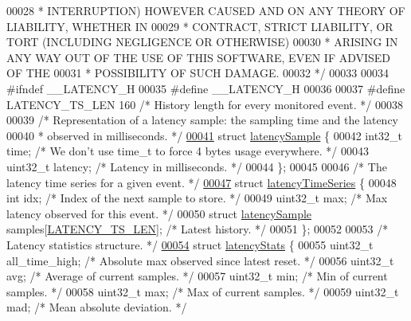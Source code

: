 \begin{DoxyCode}
00028 \textcolor{comment}{ * INTERRUPTION) HOWEVER CAUSED AND ON ANY THEORY OF LIABILITY, WHETHER IN}
00029 \textcolor{comment}{ * CONTRACT, STRICT LIABILITY, OR TORT (INCLUDING NEGLIGENCE OR OTHERWISE)}
00030 \textcolor{comment}{ * ARISING IN ANY WAY OUT OF THE USE OF THIS SOFTWARE, EVEN IF ADVISED OF THE}
00031 \textcolor{comment}{ * POSSIBILITY OF SUCH DAMAGE.}
00032 \textcolor{comment}{ */}
00033 
00034 \textcolor{preprocessor}{#}\textcolor{preprocessor}{ifndef} \textcolor{preprocessor}{\_\_LATENCY\_H}
00035 \textcolor{preprocessor}{#}\textcolor{preprocessor}{define} \textcolor{preprocessor}{\_\_LATENCY\_H}
00036 
00037 \textcolor{preprocessor}{#}\textcolor{preprocessor}{define} \textcolor{preprocessor}{LATENCY\_TS\_LEN} 160 \textcolor{comment}{/* History length for every monitored event. */}
00038 
00039 \textcolor{comment}{/* Representation of a latency sample: the sampling time and the latency}
00040 \textcolor{comment}{ * observed in milliseconds. */}
\hyperlink{structlatencySample}{00041} \textcolor{keyword}{struct} \hyperlink{structlatencySample}{latencySample} \{
00042     int32\_t time; \textcolor{comment}{/* We don't use time\_t to force 4 bytes usage everywhere. */}
00043     uint32\_t latency; \textcolor{comment}{/* Latency in milliseconds. */}
00044 \};
00045 
00046 \textcolor{comment}{/* The latency time series for a given event. */}
\hyperlink{structlatencyTimeSeries}{00047} \textcolor{keyword}{struct} \hyperlink{structlatencyTimeSeries}{latencyTimeSeries} \{
00048     \textcolor{keywordtype}{int} idx; \textcolor{comment}{/* Index of the next sample to store. */}
00049     uint32\_t max; \textcolor{comment}{/* Max latency observed for this event. */}
00050     \textcolor{keyword}{struct} \hyperlink{structlatencySample}{latencySample} samples[\hyperlink{latency_8h_a7e3ba352d9d7bb4c88c2c42c16e6674b}{LATENCY\_TS\_LEN}]; \textcolor{comment}{/* Latest history. */}
00051 \};
00052 
00053 \textcolor{comment}{/* Latency statistics structure. */}
\hyperlink{structlatencyStats}{00054} \textcolor{keyword}{struct} \hyperlink{structlatencyStats}{latencyStats} \{
00055     uint32\_t all\_time\_high; \textcolor{comment}{/* Absolute max observed since latest reset. */}
00056     uint32\_t avg;           \textcolor{comment}{/* Average of current samples. */}
00057     uint32\_t min;           \textcolor{comment}{/* Min of current samples. */}
00058     uint32\_t max;           \textcolor{comment}{/* Max of current samples. */}
00059     uint32\_t mad;           \textcolor{comment}{/* Mean absolute deviation. */}

\end{DoxyCode}
